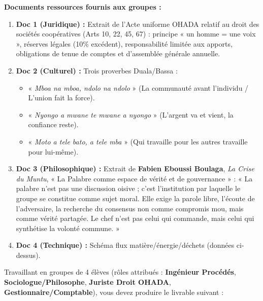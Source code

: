\documentclass[11pt]{article}
\newcounter{popsec}
\newcounter{popsub}
\newcommand{\courssub}[1]{%
  \stepcounter{popsub}%
  \par\vspace{9pt}\noindent{\popxbold\fontsize{11.5}{13}\selectfont\color{popink}{\color{poporange}\thepopsec.\thepopsub}\hspace{6pt}#1}\par\nopagebreak\vspace{4pt}
}
\begin{document}
\textbf{Documents ressources fournis aux groupes :}
\begin{enumerate}
    \item \textbf{Doc 1 (Juridique) :} Extrait de l'Acte uniforme OHADA relatif au droit des sociétés coopératives (Arts 10, 22, 45, 67) : principe « un homme = une voix », réserves légales (10\% excédent), responsabilité limitée aux apports, obligations de tenue de comptes et d'assemblée générale annuelle.
    \item \textbf{Doc 2 (Culturel) :} Trois proverbes Duala/Bassa : 
    \begin{itemize}
        \item « \emph{Mboa na mboa, ndolo na ndolo} » (La communauté avant l'individu / L'union fait la force).
        \item « \emph{Nyongo a mwane te mwane a nyongo} » (L'argent va et vient, la confiance reste).
        \item « \emph{Moto a tele bato, a tele mba} » (Qui travaille pour les autres travaille pour lui-même).
    \end{itemize}
    \item \textbf{Doc 3 (Philosophique) :} Extrait de \textbf{Fabien Eboussi Boulaga}, \emph{La Crise du Muntu}, « La Palabre comme espace de vérité et de gouvernance » : « La palabre n'est pas une discussion oisive ; c'est l'institution par laquelle le groupe se constitue comme sujet moral. Elle exige la parole libre, l'écoute de l'adversaire, la recherche du consensus non comme compromis mou, mais comme vérité partagée. Le chef n'est pas celui qui commande, mais celui qui synthétise la volonté commune. »
    \item \textbf{Doc 4 (Technique) :} Schéma flux matière/énergie/déchets (données ci-dessus).
\end{enumerate}

\courssub{Consignes}
Travaillant en groupes de 4 élèves (rôles attribués : \textbf{Ingénieur Procédés}, \textbf{Sociologue/Philosophe}, \textbf{Juriste Droit OHADA}, \textbf{Gestionnaire/Comptable}), vous devez produire le livrable suivant :
\end{document}
